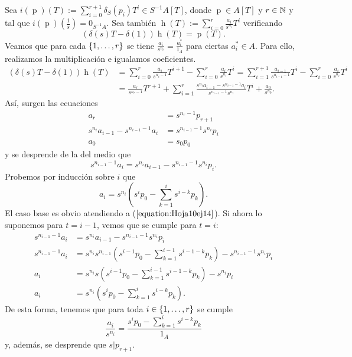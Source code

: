 \documentclass[../main.tex]{subfiles}
\begin{document}
Sea $i(\operatorname{p})(T):=\sum_{i=0}^{r+1}\delta_S(p_i)T^i\in S^{-1}A[T]$, donde $\operatorname{p}\in A[T]$ y $r\in\mathbb{N}$ y tal que $i(\operatorname{p})(\frac{1}{s})=0_{S^{-1}A}.$ Sea también $\operatorname{h}(T):=\sum_{i=0}^r\frac{a_i}{s^{n_i}}T^i$ verificando
$$(\delta(s)T-\delta(1))\operatorname{h}(T)=\operatorname{p}(T).$$
Veamos que para cada $\{1,\dots, r\}$ se tiene $\frac{a_i}{s^{n_i}}=\frac{a^*_i}{1_A}$ para ciertas $a^*_i\in A$. Para ello, realizamos la multiplicación e igualamos coeficientes.
\begin{equation}
    \begin{split}
        (\delta(s)T-\delta(1))\operatorname{h}(T)&=\sum_{i=0}^{r}\frac{a_i}{s^{n_i-1}}T^{i+1}-\sum_{i=0}^r\frac{a_i}{s^{n_i}}T^i=\sum_{i=1}^{r+1}\frac{a_{i-1}}{s^{n_{i-1}-1}}T^{i}-\sum_{i=0}^r\frac{a_i}{s^{n_i}}T^i\\
        &=\frac{a_r}{s^{n_r-1}}T^{r+1}+\sum_{i=1}^r\frac{s^{n_i}a_{i-1}-s^{n_{i-1}-1}a_{i}}{s^{n_{i-1}-1}s^{n_i}}T^{i}+\frac{a_0}{s^{n_0}}.
    \end{split}
\end{equation}
Así, surgen las ecuaciones
\begin{equation}\label{equation:Hoja10ej14}
    \begin{split}
        a_r&=s^{n_r-1}p_{r+1}\\
        s^{n_i}a_{i-1}-s^{n_{i-1}-1}a_{i}&=s^{n_{i-1}-1}s^{n_i}p_i\\
        a_0&=s_0p_0
    \end{split}
\end{equation}
y se desprende de la del medio que
$$s^{n_{i-1}-1}a_i=s^{n_i}a_{i-1}-s^{n_{i-1}-1}s^{n_i}p_i.$$
Probemos por inducción sobre $i$ que
$$a_i=s^{n_i}(s^ip_0-\sum_{k=1}^is^{i-k}p_k).$$
El caso base es obvio atendiendo a ($\ref{equation:Hoja10ej14}$). Si ahora lo suponemos para $t=i-1$, vemos que se cumple para $t=i$:
\begin{equation}
    \begin{split}
        s^{n_{i-1}-1}a_i&=s^{n_i}a_{i-1}-s^{n_{i-1}-1}s^{n_i}p_i\\
        s^{n_{i-1}-1}a_i&=s^{n_i}s^{n_{i-1}}(s^{i-1}p_0-\sum_{k=1}^{i-1}s^{i-1-k}p_k)-s^{n_{i-1}-1}s^{n_i}p_i\\
        a_i&=s^{n_i}s(s^{i-1}p_0-\sum_{k=1}^{i-1}s^{i-1-k}p_k)-s^{n_i}p_i\\
        a_i&=s^{n_i}(s^ip_0-\sum_{k=1}^is^{i-k}p_k).
    \end{split}
\end{equation}
De esta forma, tenemos que para toda $i\in\{1,\dots, r\}$ se cumple
$$\frac{a_i}{s^{n_i}}=\frac{s^ip_0-\sum_{k=1}^is^{i-k}p_k}{1_A}$$
y, además, se desprende que $s|p_{r+1}.$
\end{document}

